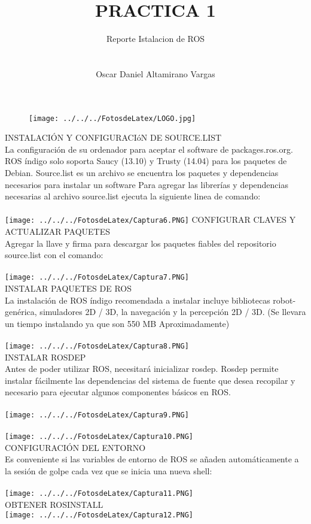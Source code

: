 \documentclass[12pt]{article}
\title{PRACTICA 1}
\author{Reporte Istalacion de ROS\\ \\ \\ Oscar Daniel Altamirano Vargas\\}
\begin{document}
 
\maketitle
\begin{figure}[hbtp]
\centering
\texttt{[image: ../../../FotosdeLatex/LOGO.jpg]}
\end{figure}
\pagebreak
INSTALACIÓN Y CONFIGURACIóN DE SOURCE.LIST   \\
La configuración de su ordenador para aceptar el software de packages.ros.org. ROS índigo solo soporta Saucy (13.10) y Trusty (14.04) para los paquetes de Debian. \cite{INDIGO2014}
Source.list es un archivo se encuentra los paquetes y dependencias necesarios para instalar un software
Para agregar las librerías y dependencias necesarias al archivo source.list ejecuta la siguiente linea de comando:\\ \\
\texttt{[image: ../../../FotosdeLatex/Captura6.PNG]} 
CONFIGURAR CLAVES Y ACTUALIZAR PAQUETES \\
Agregar la llave y firma para descargar los paquetes fiables del repositorio source.list con el comando:\\ \\
\texttt{[image: ../../../FotosdeLatex/Captura7.PNG]} \\
INSTALAR PAQUETES DE ROS \\
La instalación de ROS índigo recomendada a instalar incluye bibliotecas robot-genérica, simuladores 2D / 3D, la navegación y la percepción 2D / 3D. (Se llevara un tiempo instalando ya que son 550 MB Aproximadamente) \\ \\
\texttt{[image: ../../../FotosdeLatex/Captura8.PNG]} \\
INSTALAR ROSDEP\\
Antes de poder utilizar ROS, necesitará inicializar rosdep. Rosdep permite instalar fácilmente las dependencias del sistema de fuente que desea recopilar y necesario para ejecutar algunos componentes básicos en ROS.\\ \\
\texttt{[image: ../../../FotosdeLatex/Captura9.PNG]} \\ \\
\texttt{[image: ../../../FotosdeLatex/Captura10.PNG]} \\
CONFIGURACIÓN DEL ENTORNO \\
Es conveniente si las variables de entorno de ROS se añaden automáticamente a la sesión de golpe cada vez que se inicia una nueva shell:\\ \\
\texttt{[image: ../../../FotosdeLatex/Captura11.PNG]} \\
OBTENER ROSINSTALL \\
\texttt{[image: ../../../FotosdeLatex/Captura12.PNG]} 
\pagebreak
\nocite{*} 


\end{document}
